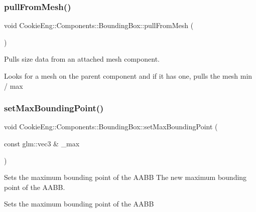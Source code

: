 \subsubsection{\texorpdfstring{pull\+From\+Mesh()}{pullFromMesh()}}
{\footnotesize\ttfamily void Cookie\+Eng\+::\+Components\+::\+Bounding\+Box\+::pull\+From\+Mesh (\begin{DoxyParamCaption}{ }\end{DoxyParamCaption})}



Pulls size data from an attached mesh component. 

Looks for a mesh on the parent component and if it has one, pulls the mesh min / max \mbox{\label{class_cookie_eng_1_1_components_1_1_bounding_box_a5ad6bf701d391f3d5357a6e103e942e2}} 
\subsubsection{\texorpdfstring{set\+Max\+Bounding\+Point()}{setMaxBoundingPoint()}}
{\footnotesize\ttfamily void Cookie\+Eng\+::\+Components\+::\+Bounding\+Box\+::set\+Max\+Bounding\+Point (\begin{DoxyParamCaption}\item[{const glm\+::vec3 \&}]{\+\_\+max }\end{DoxyParamCaption})\hspace{0.3cm}{\ttfamily [inline]}}



Sets the maximum bounding point of the A\+A\+BB  The new maximum bounding point of the A\+A\+BB. 

Sets the maximum bounding point of the A\+A\+BB \mbox{\label{class_cookie_eng_1_1_components_1_1_bounding_box_a268f31408a9f91765de7f9b052c97c85}} 
